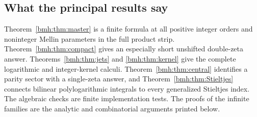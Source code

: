 \subsection{What the principal results say}
Theorem~\ref{bmh:thm:master} is a finite formula at all positive integer
orders and noninteger Mellin parameters in the full product strip.
Theorem~\ref{bmh:thm:compact} gives an especially short unshifted double-zeta
answer. Theorems~\ref{bmh:thm:jets} and \ref{bmh:thm:kernel} give the complete
logarithmic and integer-kernel calculi. Theorem~\ref{bmh:thm:central}
identifies a parity sector with a single-zeta answer, and
Theorem~\ref{bmh:thm:Stieltjes} connects bilinear polylogarithmic integrals
to every generalized Stieltjes index. The algebraic checks are finite
implementation tests. The proofs of the infinite families are the
analytic and combinatorial arguments printed below.
